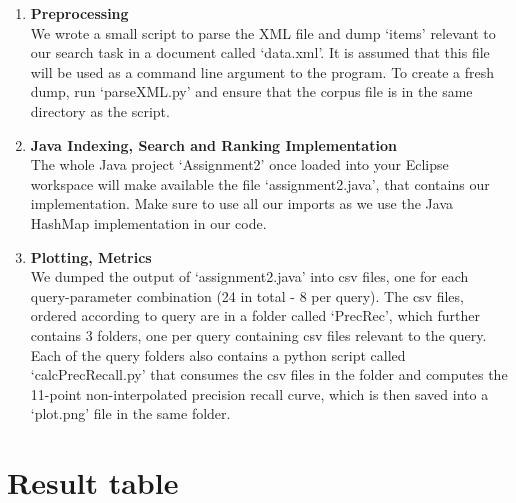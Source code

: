 \begin{enumerate}

\item {\bf Preprocessing} \\
We wrote a small script to parse the XML file and dump \lq items' relevant to our search task
in a document called \lq data.xml'. It is assumed that this file will be used as a command line
argument to the program. To create a fresh dump, run \lq parseXML.py' and ensure that the corpus
file is in the same directory as the script. 
\item {\bf Java Indexing, Search and Ranking Implementation} \\
The whole Java project \lq Assignment2' once loaded into your Eclipse workspace
will make available the file \lq assignment2.java', that contains our implementation. 
Make sure to use all our imports as we use the Java HashMap implementation in our code.
\item {\bf Plotting, Metrics} \\
We dumped the output of \lq assignment2.java' into csv files, one for each query-parameter
combination (24 in total - 8 per query). The csv files, ordered according to query are in
a folder called \lq PrecRec', which further contains 3 folders, one per query containing csv
files relevant to the query. Each of the query folders also contains a python script called \lq calcPrecRecall.py\rq 
that consumes the csv files in the folder and computes the 11-point non-interpolated precision recall curve,
which is then saved into a \lq plot.png' file in the same folder. 
\end{enumerate}

\newpage
\section{Result table} \label{App:table}

